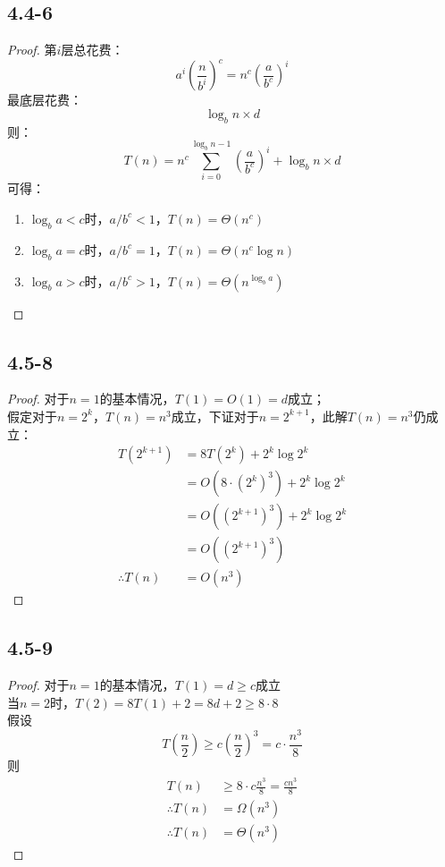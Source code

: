 \documentclass[twocolumn]{article}
\begin{document}
	\subsection*{4.4-6}
	\begin{proof}
		第$i$层总花费：
		$$a^i\left(\frac{n}{b^i}\right)^c=n^c\left(\frac{a}{b^c}\right)^i$$
		最底层花费：
		$$\log_b n\times d$$
		则：$$T(n)=n^c\sum_{i=0}^{\log_b n-1}\left(\frac{a}{b^c}\right)^i+\log_b n\times d$$
		可得：
		\begin{enumerate}[1.]
			\item $\log_b a<c$时，$a/b^c<1$，$T(n)=\Theta(n^c)$
				\item $\log_b a=c$时，$a/b^c=1$，$T(n)=\Theta(n^c\log n)$
					\item $\log_b a>c$时，$a/b^c>1$，$T(n)=\Theta(n^{\log_b a})$
		\end{enumerate}
	\end{proof}
	\subsection*{4.5-8}
	\begin{proof}
		对于$n=1$的基本情况，$T(1)=O(1)=d$成立；\\
		假定对于$n=2^k$，$T(n)=n^3$成立，下证对于$n=2^{k+1}$，此解$T(n)=n^3$仍成立：
		\[
		\begin{aligned}
			T(2^{k+1})&=8T(2^k)+2^k\log 2^k\\
			&=O(8\cdot(2^k)^3)+2^k\log 2^k\\
			&=O((2^{k+1})^3)+2^k\log 2^k\\
			&=O((2^{k+1})^3)\\
			\therefore T(n)&=O(n^3)
		\end{aligned}
		\]
	\end{proof}
	\subsection*{4.5-9}
	\begin{proof}
		对于$n=1$的基本情况，$T(1)=d\ge c$成立\\
		当$n=2$时，$T(2)=8T(1)+2=8d+2\ge 8\cdot 8$\\
		假设$$T\left(\frac{n}{2}\right)\ge c\left(\frac{n}{2}\right)^3=c\cdot \frac{n^3}{8}$$
		则
		\[
			\begin{aligned}
				T(n)&\ge 8\cdot c\frac{n^3}{8}=\frac{cn^3}{8}\\
				\therefore T(n)&=\Omega(n^3)\\
				\therefore T(n)&=\Theta(n^3)
			\end{aligned}	
		\]
	\end{proof}
\end{document}
